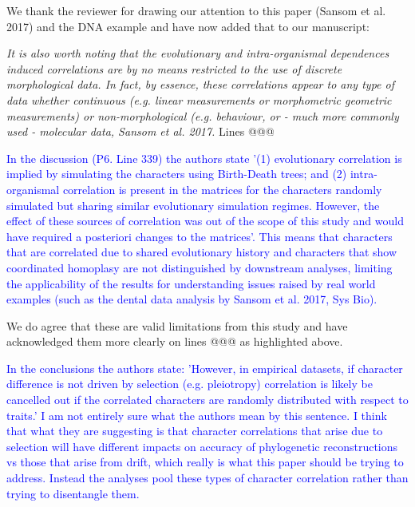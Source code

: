 \documentclass[12pt,letterpaper]{article}
\begin{document}
We thank the reviewer for drawing our attention to this paper (Sansom et al. 2017) and the DNA example and have now added that to our manuscript:

\textit{It is also worth noting that the evolutionary and intra-organismal dependences induced correlations are by no means restricted to the use of discrete morphological data. In fact, by essence, these correlations appear to any type of data whether continuous (e.g. linear measurements or morphometric geometric measurements) or non-morphological (e.g. behaviour, or - much more commonly used - molecular data, Sansom et al. 2017.} Lines @@@




\textcolor{blue}{In the discussion (P6. Line 339) the authors state '(1) evolutionary correlation is implied by simulating the characters using Birth-Death trees; and (2) intra-organismal correlation is present in the matrices for the characters randomly simulated but sharing similar evolutionary simulation regimes.  However, the effect of these sources of correlation was out of the scope of this study and would have required a posteriori changes to the matrices'. This means that characters that are correlated due to shared evolutionary history and characters that show coordinated homoplasy are not distinguished by downstream analyses, limiting the applicability of the results for understanding issues raised by real world examples (such as the dental data analysis by Sansom et al. 2017, Sys Bio).}

We do agree that these are valid limitations from this study and have acknowledged them more clearly on lines @@@ as highlighted above.



\textcolor{blue}{In the conclusions the authors state: 'However, in empirical datasets, if character difference is not driven by selection (e.g. pleiotropy) correlation is likely be cancelled out if the correlated characters are randomly distributed with respect to traits.' I am not entirely sure what the authors mean by this sentence. I think that what they are suggesting is that character correlations that arise due to selection will have different impacts on accuracy of phylogenetic reconstructions vs those that arise from drift, which really is what this paper should be trying to address. Instead the analyses pool these types of character correlation rather than trying to disentangle them.}
\end{document}
